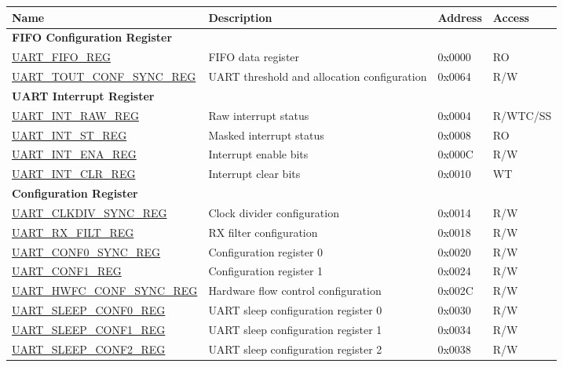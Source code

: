 \begin{longtable}{ | p{6.1cm} | p{7cm} | p{1.3cm} | p{1.6cm} | }
\hline\rowcolor{lightgray}
Name & Description &  Address & Access \\ \hline
\endhead
\multicolumn{4}{|l|}{\textbf{FIFO Configuration Register}} \\ \hline
\hyperref[regdesc:UARTFIFOREG]{UART\_FIFO\_REG} & FIFO data register & 0x0000 & RO \\ \hline
\hyperref[regdesc:UARTTOUTCONFSYNCREG]{UART\_TOUT\_CONF\_SYNC\_REG} & UART threshold and allocation configuration & 0x0064 & R/W \\ \hline
\multicolumn{4}{|l|}{\textbf{UART Interrupt Register}} \\ \hline
\hyperref[regdesc:UARTINTRAWREG]{UART\_INT\_RAW\_REG} & Raw interrupt status & 0x0004 & R/WTC/SS \\ \hline
\hyperref[regdesc:UARTINTSTREG]{UART\_INT\_ST\_REG} & Masked interrupt status & 0x0008 & RO \\ \hline
\hyperref[regdesc:UARTINTENAREG]{UART\_INT\_ENA\_REG} & Interrupt enable bits & 0x000C & R/W \\ \hline
\hyperref[regdesc:UARTINTCLRREG]{UART\_INT\_CLR\_REG} & Interrupt clear bits & 0x0010 & WT \\ \hline
\multicolumn{4}{|l|}{\textbf{Configuration Register}} \\ \hline
\hyperref[regdesc:UARTCLKDIVSYNCREG]{UART\_CLKDIV\_SYNC\_REG} & Clock divider configuration & 0x0014 & R/W \\ \hline
\hyperref[regdesc:UARTRXFILTREG]{UART\_RX\_FILT\_REG} & RX filter configuration & 0x0018 & R/W \\ \hline
\hyperref[regdesc:UARTCONF0SYNCREG]{UART\_CONF0\_SYNC\_REG} & Configuration register 0 & 0x0020 & R/W \\ \hline
\hyperref[regdesc:UARTCONF1REG]{UART\_CONF1\_REG} & Configuration register 1 & 0x0024 & R/W \\ \hline
\hyperref[regdesc:UARTHWFCCONFSYNCREG]{UART\_HWFC\_CONF\_SYNC\_REG} & Hardware flow control configuration & 0x002C & R/W \\ \hline
\hyperref[regdesc:UARTSLEEPCONF0REG]{UART\_SLEEP\_CONF0\_REG} & UART sleep configuration register 0 & 0x0030 & R/W \\ \hline
\hyperref[regdesc:UARTSLEEPCONF1REG]{UART\_SLEEP\_CONF1\_REG} & UART sleep configuration register 1 & 0x0034 & R/W \\ \hline
\hyperref[regdesc:UARTSLEEPCONF2REG]{UART\_SLEEP\_CONF2\_REG} & UART sleep configuration register 2 & 0x0038 & R/W \\ \hline

\end{longtable}
